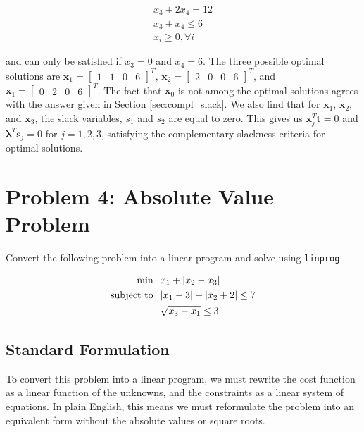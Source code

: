 \documentclass{article}
\begin{document}
\begin{align*}
x_3 + 2x_4 = 12\\
x_3 + x_4 \le 6\\
x_i \ge 0, \forall i
\end{align*}

\noindent and can only be satisfied if $x_3 = 0$ and $x_4 = 6$. The three possible optimal solutions are $\mathbf{x}_1 = \begin{bmatrix}1 & 1 & 0 & 6\end{bmatrix}^T$, $\mathbf{x}_2 = \begin{bmatrix}2 & 0 & 0 & 6\end{bmatrix}^T$, and $\mathbf{x}_1 = \begin{bmatrix}0 & 2 & 0 & 6\end{bmatrix}^T$.
The fact that $\mathbf{x}_0$ is not among the optimal solutions agrees with the answer given in Section \ref{sec:compl_slack}. 
We also find that for $\mathbf{x}_1$, $\mathbf{x}_2$, and $\mathbf{x}_3$, the slack variables, $s_1$ and $s_2$ are equal to zero.
This gives us $\mathbf{x}_j^T \mathbf{t} = 0$ and $\boldsymbol{\lambda}^T \mathbf{s}_j = 0$ for $j = 1, 2, 3$, satisfying the complementary slackness criteria for optimal solutions.

\newpage

\section{Problem 4: Absolute Value Problem}

Convert the following problem into a linear program and solve using \texttt{linprog}.

\begin{align} \label{eq:abs_cost}
\text{min} & \hspace{0.1in} x_1 + |x_2 - x_3|\\ \label{eq:abs_const1}
\text{subject to} & \hspace{0.1in} |x_1 - 3| + |x_2 + 2| \le 7\\ \label{eq:abs_const2}
& \hspace{0.1in} \sqrt{x_3 - x_1} \le 3
\end{align}

\subsection{Standard Formulation}

To convert this problem into a linear program, we must rewrite the cost function as a linear function of the unknowns, and the constraints as a linear system of equations.
In plain English, this means we must reformulate the problem into an equivalent form without the absolute values or square roots.
\end{document}
